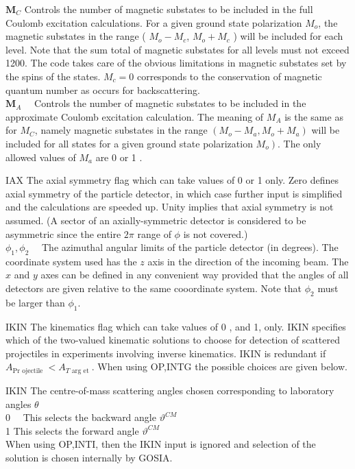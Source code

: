 \documentclass[10pt]{article}
\begin{document}
$\mathbf{M}_{C}$ Controls the number of magnetic substates to be included in the full Coulomb excitation calculations. For a given ground state polarization $M_{o}$, the magnetic substates in the range ( $M_{o}-M_{c}$, $M_{o}+M_{c}$ ) will be included for each level. Note that the sum total of magnetic substates for all levels must not exceed 1200. The code takes care of the obvious limitations in magnetic substates set by the spins of the states. $M_{c}=0$ corresponds to the conservation of magnetic quantum number as occurs for backscattering.\\
$\mathbf{M}_{A} \quad$ Controls the number of magnetic substates to be included in the approximate Coulomb excitation calculation. The meaning of $M_{A}$ is the same as for $M_{C}$, namely magnetic substates in the range $\left(M_{o}-M_{a}, M_{o}+M_{a}\right)$ will be included for all states for a given ground state polarization $\left.M_{o}\right)$. The only allowed values of $M_{a}$ are 0 or 1 .

IAX The axial symmetry flag which can take values of 0 or 1 only. Zero defines axial symmetry of the particle detector, in which case further input is simplified and the calculations are speeded up. Unity implies that axial symmetry is not assumed. (A sector of an axially-symmetric detector is considered to be asymmetric since the entire $2 \pi$ range of $\phi$ is not covered.)\\
$\phi_{1}, \phi_{2} \quad$ The azimuthal angular limits of the particle detector (in degrees). The coordinate system used has the $z$ axis in the direction of the incoming beam. The $x$ and $y$ axes can be defined in any convenient way provided that the angles of all detectors are given relative to the same cooordinate system. Note that $\phi_{2}$ must be larger than $\phi_{1}$.

IKIN The kinematics flag which can take values of 0 , and 1, only. IKIN specifies which of the two-valued kinematic solutions to choose for detection of scattered projectiles in experiments involving inverse kinematics. IKIN is redundant if $A_{\operatorname{Pr} \text { ojectile }}<A_{T \text { arg et }}$. When using OP,INTG the possible choices are given below.

IKIN The centre-of-mass scattering angles chosen corresponding to laboratory angles $\theta$\\
$0 \quad$ This selects the backward angle $\vartheta^{C M}$\\
1 This selects the forward angle $\vartheta^{C M}$\\
When using OP,INTI, then the IKIN input is ignored and selection of the solution is chosen internally by GOSIA.
\end{document}

